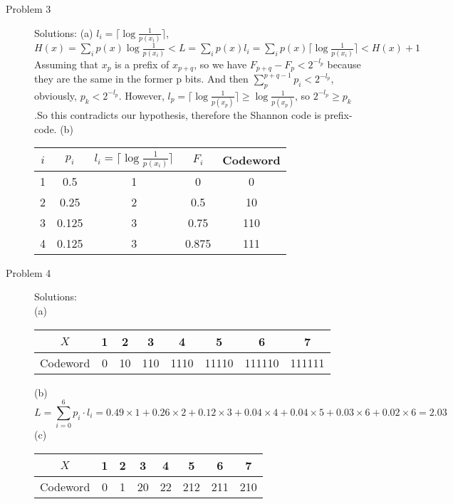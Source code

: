 \documentclass[11pt]{article}
\begin{document}
\begin{description}
    \item[Problem 3] Solutions:
        \subitem(a) $l_{i}=\lceil \log\frac{1}{p(x_i)} \rceil$, \\[8pt] $H(x)=\displaystyle\sum_{i}p(x)\log\frac{1}{p(x_i)}  < L = \displaystyle\sum_{i}p(x)l_{i}=\displaystyle\sum_{i}p(x)\lceil \log\frac{1}{p(x_i)} \rceil < H(x)+1$ \\[8pt]
            Assuming that $x_p$ is a prefix of $x_{p+q}$, so we have $F_{p+q} - F_{p} < 2^{-l_p}$ because they are the same in the former p bits. And then $\displaystyle\sum_{p}^{p+q-1}p_i < 2^{-l_p}$, obviously, $p_k < 2^{-l_p}$. However, $l_{p}=\lceil \log\frac{1}{p(x_p)} \rceil \geq \log \frac{1}{p(x_p)}$, so $2^{-l_p} \geq p_k$.So this contradicts our hypothesis, therefore the Shannon code is prefix-code.
        \subitem(b)
           \begin{table}[h!]
    \centering
    \begin{tabular}{ccccc}
        \toprule
        \(i\) & \(p_i\) & \(l_i = \lceil \log \frac{1}{p(x_i)} \rceil\) & \(F_i\) & Codeword\\
        \midrule
        1 & 0.5   & 1 & 0     & 0\\
        2 & 0.25  & 2 & 0.5   & 10\\
        3 & 0.125 & 3 & 0.75  & 110\\
        4 & 0.125 & 3 & 0.875 & 111\\
        \bottomrule
    \end{tabular}
    \label{tab:shannon_fano}
\end{table}


    \item[Problem 4] Solutions:\\
        \subitem(a)
\begin{table}[h!]
    \centering
    \begin{tabular}{cccccccc}
        \toprule
        \(X\) & 1 & 2 & 3 & 4 & 5 & 6 & 7 \\
        \midrule
        Codeword & 0 & 10 & 110 & 1110 & 11110 & 111110 & 111111 \\
        \bottomrule
    \end{tabular}
\end{table}
        \subitem(b)\[L = \sum_{i=0}^6 p_i \cdot l_i = 0.49 \times 1 + 0.26 \times 2 + 0.12 \times 3 + 0.04 \times 4 + 0.04 \times 5 + 0.03 \times 6 + 0.02 \times 6 = 2.03\]
        \subitem(c)
    \begin{table}[h!]
    \centering
    \begin{tabular}{cccccccc}
        \toprule
        \(X\) & 1 & 2 & 3 & 4 & 5 & 6 & 7 \\
        \midrule
        Codeword & 0 & 1 & 20 & 22 & 212 & 211 & 210 \\
        \bottomrule
    \end{tabular}
\end{table}


\end{description}
\end{document}
